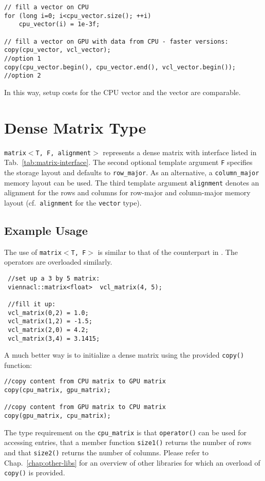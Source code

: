   \begin{lstlisting}
// fill a vector on CPU
for (long i=0; i<cpu_vector.size(); ++i)
    cpu_vector(i) = 1e-3f;

// fill a vector on GPU with data from CPU - faster versions:
copy(cpu_vector, vcl_vector);                                   //option 1
copy(cpu_vector.begin(), cpu_vector.end(), vcl_vector.begin()); //option 2
\end{lstlisting}
In this way, setup costs for the CPU vector and the {\ViennaCL} vector are comparable.

\section{Dense Matrix Type}
\texttt{matrix$<$T, F, alignment$>$} represents a dense matrix with interface listed in
Tab.~\ref{tab:matrix-interface}. The second optional template argument \texttt{F}
specifies the storage layout and defaults to \texttt{row\_major}. As an alternative, a \lstinline|column_major| memory layout can be used.
The third template argument \texttt{alignment} denotes an alignment for the rows and columns for row-major and column-major memory layout (cf.~\texttt{alignment} for the \texttt{vector} type).

\subsection{Example Usage}
The use of \texttt{matrix$<$T, F$>$} is similar to that of the counterpart in {\ublas}. The operators are overloaded similarly.

\begin{lstlisting}
 //set up a 3 by 5 matrix:
 viennacl::matrix<float>  vcl_matrix(4, 5);

 //fill it up:
 vcl_matrix(0,2) = 1.0;
 vcl_matrix(1,2) = -1.5;
 vcl_matrix(2,0) = 4.2;
 vcl_matrix(3,4) = 3.1415;
\end{lstlisting}


A much better way is to initialize a dense matrix using the provided \texttt{copy()} function:
\begin{lstlisting}
//copy content from CPU matrix to GPU matrix
copy(cpu_matrix, gpu_matrix);

//copy content from GPU matrix to CPU matrix
copy(gpu_matrix, cpu_matrix);
\end{lstlisting}
The type requirement on the \texttt{cpu\_matrix} is that \texttt{operator()} can be used for accessing entries, that a member function \texttt{size1()} returns the number of rows and that \texttt{size2()} returns the number of columns.
Please refer to Chap.~\ref{chap:other-libs} for an overview of other libraries for which an overload of \texttt{copy()} is provided.

